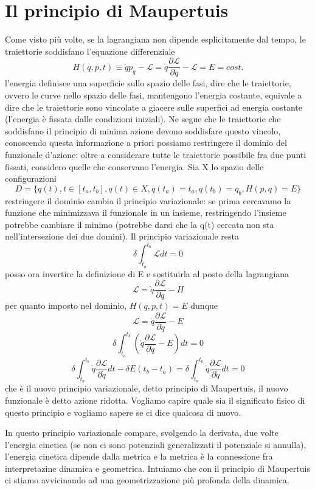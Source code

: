\documentclass[
10pt, %
a4paper, %
oneside, %
headinclude,footinclude, %
BCOR5mm, %
]{scrartcl}
\begin{document}
\section{Il principio di Maupertuis}
Come visto più volte, se la lagrangiana non dipende esplicitamente dal tempo, le traiettorie soddisfano l'equazione differenziale 
\[H(q, p, t) \equiv \dot{q}p_q-\mathcal{L} = \dot{q}\frac{\partial \mathcal{L}}{\partial \dot{q}}-\mathcal{L} = E = cost.\]
l'energia definisce una superficie sullo spazio delle fasi, dire che le traiettorie, ovvero le curve nello spazio delle fasi, mantengono l'energia costante, equivale a dire che le traiettorie sono vincolate a giacere sulle superfici ad energia costante (l'energia è fissata dalle condizioni iniziali). Ne segue che le traiettorie che soddisfano il principio di minima azione devono soddisfare questo vincolo, conoscendo questa informazione a priori possiamo restringere il dominio del funzionale d'azione: oltre a considerare tutte le traiettorie possibile fra due punti fissati, considero quelle che conservano l'energia. Sia X lo spazio delle configurazioni
\[D = \{q(t), t\in[t_a, t_b], q(t)\in X, q(t_a) = t_a, q(t_b) = q_b, H(p, q) = E\}\] 
restringere il dominio cambia il principio variazionale: se prima cercavamo la funzione che minimizzava il funzionale in un insieme, restringendo l'insieme potrebbe cambiare il minimo (potrebbe darsi che la q(t) cercata non sta nell'intersezione dei due domini). Il principio variazionale resta
\[\delta\int_{t_a}^{t_b}\mathcal{L}dt = 0\]
posso ora invertire la definizione di E e sostituirla al posto della lagrangiana
\[\mathcal{L} = \dot{q}\frac{\partial \mathcal{L}}{\partial \dot{q}}-H\]
per quanto imposto nel dominio, \(H(q, p, t) = E\) dunque
\[\mathcal{L} = \dot{q}\frac{\partial \mathcal{L}}{\partial \dot{q}}-E\]
\[\delta\int_{t_a}^{t_b}\left(\dot{q}\frac{\partial \mathcal{L}}{\partial \dot{q}}-E\right)dt = 0\]
\[\delta\int_{t_a}^{t_b}\dot{q}\frac{\partial \mathcal{L}}{\partial \dot{q}}dt-\delta E(t_b-t_a) = \delta\int_{t_a}^{t_b}\dot{q}\frac{\partial \mathcal{L}}{\partial \dot{q}}dt =  0\]
che è il nuovo principio variazionale, detto principio di Maupertuis, il nuovo funzionale è detto azione ridotta. Vogliamo capire quale sia il significato fisico di questo principio e vogliamo sapere  se ci dice qualcosa di nuovo. 
\begin{osservazione}
	In questo principio variazionale compare, svolgendo la derivata, due volte l'energia cinetica (se non ci sono potenziali generalizzati il potenziale si annulla), l'energia cinetica dipende dalla metrica e la metrica è la connessione fra interpretazine dinamica e geometrica. Intuiamo che con il principio di Maupertuis ci stiamo avvicinando ad una geometrizzazione più profonda della dinamica.
\end{osservazione}
\end{document}

